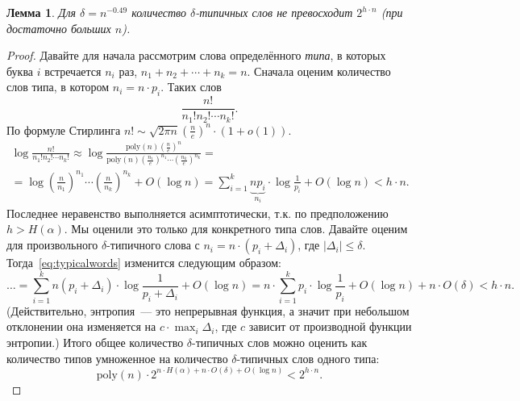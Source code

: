 \documentclass[12pt]{article}
\newcommand{\poly}{\mathrm{poly}}
\theoremstyle{definition}
\theoremstyle{plain}
\newtheorem{lemma}{Лемма}[section]
\theoremstyle{remark}
\begin{document}
\begin{lemma}\label{lm:typicalcount}
    Для $\delta = n^{-0.49}$ количество $\delta$-типичных слов не превосходит
    $2^{h\cdot n}$ (при достаточно больших $n$).
\end{lemma}
\begin{proof}
    Давайте для начала рассмотрим слова определённого \emph{типа}, в которых
    буква $i$ встречается $n_i$ раз, $n_1+n_2+\dotsb + n_k = n$. Сначала оценим
    количество слов типа, в котором $n_i = n\cdot p_i$. Таких слов
    \[
        \frac{n!}{n_1!n_2!\dotsm n_k!}.
    \]
    По формуле Стирлинга $n! \sim \sqrt{2\pi n}\left(\frac{n}{e}\right)^n\cdot(1+o(1))$.
    \begin{multline}\label{eq:typicalwords}
        \log \frac{n!}{n_1!n_2!\dotsm n_k!} \approx 
        \log \frac{\poly(n) \left(\frac{n}{e}\right)^n}
            {\poly(n)\left(\frac{n_1}{e}\right)^{n_1}\dotsm
            \left(\frac{n_k}{e}\right)^{n_k}} = \\
        = \log \left(\frac{n}{n_1}\right)^{n_1}\dotsm
            \left(\frac{n}{n_k}\right)^{n_k} + O(\log n) 
        = \sum_{i=1}^k \underbrace{np_i}_{n_i}\cdot
            \log{\textstyle\frac{1}{p_i}} + O(\log n) < h\cdot n.
    \end{multline}
    Последнее неравенство выполняется асимптотически, т.к. по предположению $h > H(\alpha)$.
    Мы оценили это только для конкретного типа слов. Давайте оценим для
    произвольного $\delta$-типичного слова с $n_i = n\cdot(p_i + \Delta_i)$,
    где $|\Delta_i| \le \delta$. Тогда~\eqref{eq:typicalwords} изменится следующим образом:
    \[    
        \dots = 
        \sum_{i=1}^k n(p_i + \Delta_i)\cdot
            \log{\textstyle\frac{1}{p_i + \Delta_i}} + O(\log n) =         
        n\cdot \sum_{i=1}^k p_i\cdot
            \log{\textstyle\frac{1}{p_i}} + O(\log n) + n\cdot O(\delta) < h\cdot n. 
    \]
    (Действительно, энтропия~--- это непрерывная функция, а значит при небольшом 
    отклонении она изменяется на $c\cdot \max_i\Delta_i$, где $c$ зависит от производной функции энтропии.)
    Итого общее количество $\delta$-типичных слов можно оценить как количество
    типов умноженное на количество $\delta$-типичных слов одного типа:
    \[
        \poly(n) \cdot 2^{n\cdot H(\alpha) + n\cdot O(\delta) + O(\log n)} <
        2^{h\cdot n}.   
    \]
\end{proof}
\end{document}
